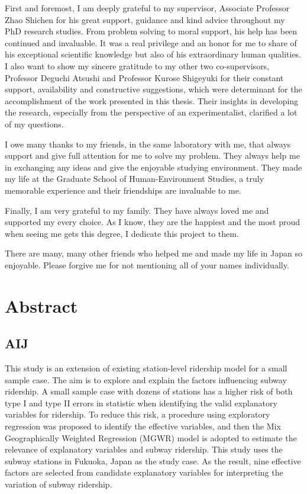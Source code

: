 \documentclass[12pt, oneside, a4paper]{book}
\begin{document}
%
First and foremost, I am deeply grateful to my supervisor, Associate Professor Zhao Shichen for his great support, guidance and kind advice throughout my PhD research studies. From problem solving to moral support, his help has been continued and invaluable. It was a real privilege and an honor for me to share of his exceptional scientific knowledge but also of his extraordinary human qualities.
I also want to show my sincere gratitude to my other two co-supervisors, Professor Deguchi Atsushi and Professor Kurose Shigeyuki for their constant support, availability and constructive suggestions, which were determinant for the accomplishment of the work presented in this thesis. Their insights in developing the research, especially from the perspective of an experimentalist, clarified a lot of my questions.

%
I owe many thanks to my friends, in the same laboratory with me, that always support and give full attention for me to solve my problem. They always help me in exchanging any ideas and give the enjoyable studying environment. They made my life at the Graduate School of Human-Environment Studies, a truly memorable experience and their friendships are invaluable to me.

%
Finally, I am very grateful to my family. They have always loved me and supported my every choice. As I know, they are the happiest and the most proud when seeing me gets this degree, I dedicate this project to them. 

%
There are many, many other friends who helped me and made my life in Japan so enjoyable. Please forgive me for not mentioning all of your names individually.

\chapter{Abstract}
\section{AIJ}
This study is an extension of existing station-level ridership model for a small sample case. The aim is to explore and explain the factors influencing subway ridership. A small sample case with dozens of stations has a higher risk of both type I and type II errors in statistic when identifying the valid explanatory variables for ridership. To reduce this risk, a procedure using exploratory regression was proposed to identify the effective variables, and then the Mix Geographically Weighted Regression (MGWR) model is adopted to estimate the relevance of explanatory variables and subway ridership. This study uses the subway stations in Fukuoka, Japan as the study case. As the result, nine effective factors are selected from candidate explanatory variables for interpreting the variation of subway ridership.
\end{document}
